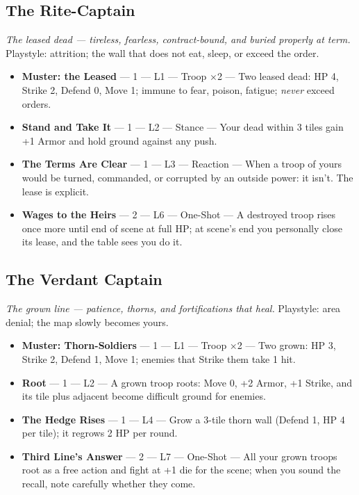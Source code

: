 \subsection{The Rite-Captain}
\textit{The leased dead --- tireless, fearless, contract-bound, and buried properly at term.} Playstyle: attrition; the wall that does not eat, sleep, or exceed the order.
\begin{itemize}
    \item \textbf{Muster: the Leased} --- 1 --- L1 --- Troop ×2 --- Two leased dead: HP 4, Strike 2, Defend 0, Move 1; immune to fear, poison, fatigue; \textit{never} exceed orders.
    \item \textbf{Stand and Take It} --- 1 --- L2 --- Stance --- Your dead within 3 tiles gain +1 Armor and hold ground against any push.
    \item \textbf{The Terms Are Clear} --- 1 --- L3 --- Reaction --- When a troop of yours would be turned, commanded, or corrupted by an outside power: it isn't. The lease is explicit.
    \item \textbf{Wages to the Heirs} --- 2 --- L6 --- One-Shot --- A destroyed troop rises once more until end of scene at full HP; at scene's end you personally close its lease, and the table sees you do it.
\end{itemize}

\subsection{The Verdant Captain}
\textit{The grown line --- patience, thorns, and fortifications that heal.} Playstyle: area denial; the map slowly becomes yours.
\begin{itemize}
    \item \textbf{Muster: Thorn-Soldiers} --- 1 --- L1 --- Troop ×2 --- Two grown: HP 3, Strike 2, Defend 1, Move 1; enemies that Strike them take 1 hit.
    \item \textbf{Root} --- 1 --- L2 --- A grown troop roots: Move 0, +2 Armor, +1 Strike, and its tile plus adjacent become difficult ground for enemies.
    \item \textbf{The Hedge Rises} --- 1 --- L4 --- Grow a 3-tile thorn wall (Defend 1, HP 4 per tile); it regrows 2 HP per round.
    \item \textbf{Third Line's Answer} --- 2 --- L7 --- One-Shot --- All your grown troops root as a free action and fight at +1 die for the scene; when you sound the recall, note carefully whether they come.
\end{itemize}

